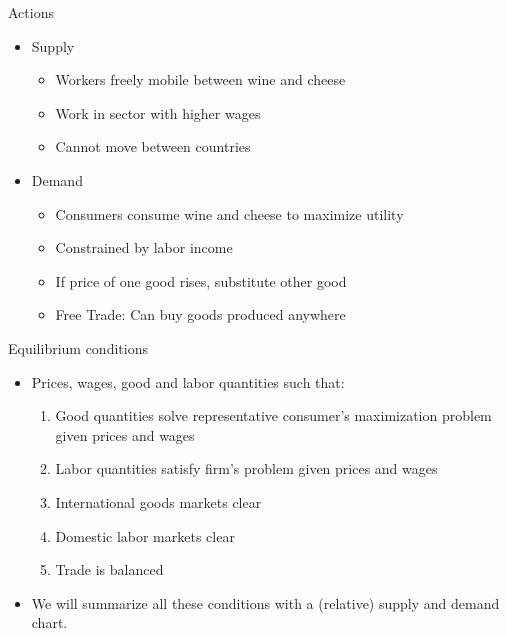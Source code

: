 \documentclass[ignorenonframetext,]{beamer}
\begin{document}
\begin{frame}{Actions}

    \begin{itemize}
        \item Supply
        \begin{itemize}
            \item Workers freely mobile between wine and cheese
            \item Work in sector with higher wages 
            \item Cannot move between countries 
        \end{itemize}
        \item Demand
        \begin{itemize}
            \item Consumers consume wine and cheese to maximize utility
            \item Constrained by labor income
            \item If price of one good rises, substitute other good
            \item Free Trade: Can buy goods produced anywhere
        \end{itemize}
    \end{itemize}

\end{frame}

\begin{frame}{Equilibrium conditions}

    \begin{itemize}
        \item Prices, wages, good and labor quantities such that:
        \begin{enumerate}
            \item Good quantities solve representative consumer's maximization problem given prices and wages 
            \item Labor quantities satisfy firm's problem given prices and wages
            \item International goods markets clear
            \item Domestic labor markets clear
            \item Trade is balanced
        \end{enumerate}
        \item We will summarize all these conditions with a (relative) supply and demand chart.
    \end{itemize}

\end{frame}
\end{document}
